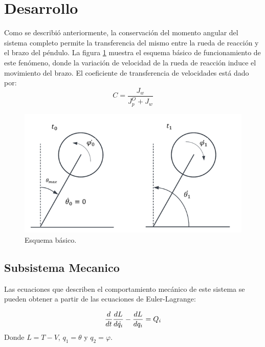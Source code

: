 \documentclass{article}
\begin{document}
\section{Desarrollo}
    Como se describió anteriormente, la conservación del momento angular del sistema completo permite la transferencia del mismo entre la rueda de 
    reacción y el brazo del péndulo. La figura \ref{fig:esquema1} muestra el esquema básico de funcionamiento de este fenómeno, donde la variación
    de velocidad de la rueda de reacción induce el movimiento del brazo. El coeficiente de transferencia de velocidades está dado por\cite[text]{1}:
    \begin{equation}
        C = \frac{J_w}{J_p^O + J_w}
    \end{equation}
    \begin{figure}[h!]
        \includegraphics[width=\linewidth]{images/sys_schem.png}
        \caption{Esquema básico.}
        \label{fig:esquema1}
    \end{figure}
    \newpage
    \subsection{Subsistema Mecanico}
        Las ecuaciones que describen el comportamiento mecánico de este sistema se pueden obtener a partir de las ecuaciones de Euler-Lagrange:
        
        
        \begin{equation*}
            \frac{d}{dt}\frac{dL}{d \dot{q_i}} - \frac{dL}{dq_i} = Q_i\\
        \end{equation*}
        Donde $L = T - V$, $q_1 = \theta$ y $q_2 = \varphi$.
\end{document}
